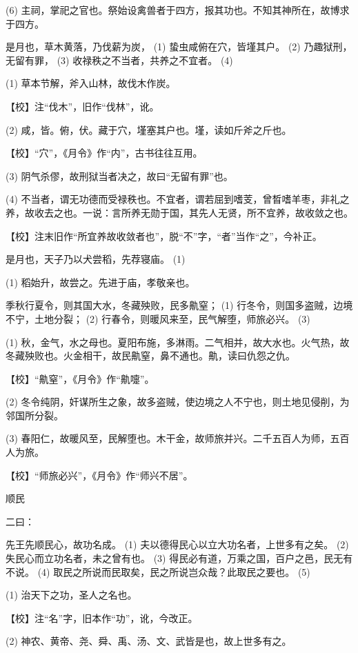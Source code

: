 \documentclass[12pt,UTF8]{ctexbook}
\begin{document}
(6) 主祠，掌祀之官也。祭始设禽兽者于四方，报其功也。不知其神所在，故博求于四方。

是月也，草木黄落，乃伐薪为炭， (1) 蛰虫咸俯在穴，皆墐其户。 (2) 乃趣狱刑，无留有罪， (3) 收禄秩之不当者，共养之不宜者。 (4)

(1) 草本节解，斧入山林，故伐木作炭。

【校】注“伐木”，旧作“伐林”，讹。

(2) 咸，皆。俯，伏。藏于穴，墐塞其户也。墐，读如斤斧之斤也。

【校】“穴”，《月令》作“内”，古书往往互用。

(3) 阴气杀僇，故刑狱当者决之，故曰“无留有罪”也。

(4) 不当者，谓无功德而受禄秩也。不宜者，谓若屈到嗜芰，曾晳嗜羊枣，非礼之养，故收去之也。一说：言所养无勋于国，其先人无贤，所不宜养，故收敛之也。

【校】注末旧作“所宜养故收敛者也”，脱“不”字，“者”当作“之”，今补正。

是月也，天子乃以犬尝稻，先荐寝庙。 (1)

(1) 稻始升，故尝之。先进于庙，孝敬亲也。

季秋行夏令，则其国大水，冬藏殃败，民多鼽窒； (1) 行冬令，则国多盗贼，边境不宁，土地分裂； (2) 行春令，则暖风来至，民气解堕，师旅必兴。 (3)

(1) 秋，金气，水之母也。夏阳布施，多淋雨。二气相并，故大水也。火气热，故冬藏殃败也。火金相干，故民鼽窒，鼻不通也。鼽，读曰仇怨之仇。

【校】“鼽窒”，《月令》作“鼽嚏”。

(2) 冬令纯阴，奸谋所生之象，故多盗贼，使边境之人不宁也，则土地见侵削，为邻国所分裂。

(3) 春阳仁，故暖风至，民解堕也。木干金，故师旅并兴。二千五百人为师，五百人为旅。

【校】“师旅必兴”，《月令》作“师兴不居”。





顺民


二曰：

先王先顺民心，故功名成。 (1) 夫以德得民心以立大功名者，上世多有之矣。 (2) 失民心而立功名者，未之曾有也。 (3) 得民必有道，万乘之国，百户之邑，民无有不说。 (4) 取民之所说而民取矣，民之所说岂众哉？此取民之要也。 (5)

(1) 治天下之功，圣人之名也。

【校】注“名”字，旧本作“功”，讹，今改正。

(2) 神农、黄帝、尧、舜、禹、汤、文、武皆是也，故上世多有之。
\end{document}
